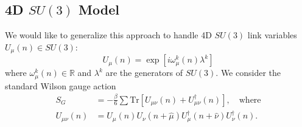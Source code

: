 \documentclass[a4paper,11pt]{article}
\begin{document}
\subsection{\label{subsec:4dSU3}4D \texorpdfstring{$SU(3)$}{SU(3)} Model}
%
%
We would like to generalize this approach to handle 4D $SU(3)$ link variables $U_{\mu}(n) \in SU(3)$:
%
\begin{equation}
U_{\mu}(n) = \exp\left[i \omega_{\mu}^{k}(n) \lambda^{k} \right]
\end{equation}
%
where $\omega_{\mu}^{k}(n) \in \mathbb{R}$ and $\lambda^{k}$ are the generators
of $SU(3)$.
%
We consider the standard Wilson gauge action
%
\begin{align}
S_{G} &= -\frac{\beta}{6}\sum \mathrm{Tr}\left[U_{\mu\nu}(n) + U^{\dagger}_{\mu\nu}(n) \right],\quad\text{where} \\
U_{\mu\nu}(n) &= U_{\mu}(n) U_{\nu}(n + \hat{\mu}) U_{\mu}^{\dagger}(n + \hat{\nu}) U^{\dagger}_{\nu}(n).
\end{align}
%
\end{document}
